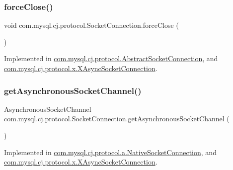\subsubsection{\texorpdfstring{force\+Close()}{forceClose()}}
{\footnotesize\ttfamily void com.\+mysql.\+cj.\+protocol.\+Socket\+Connection.\+force\+Close (\begin{DoxyParamCaption}{ }\end{DoxyParamCaption})}



Implemented in \mbox{\hyperlink{classcom_1_1mysql_1_1cj_1_1protocol_1_1_abstract_socket_connection_a1c207a3f49d387dec92de48fc141de65}{com.\+mysql.\+cj.\+protocol.\+Abstract\+Socket\+Connection}}, and \mbox{\hyperlink{classcom_1_1mysql_1_1cj_1_1protocol_1_1x_1_1_x_async_socket_connection_ac282682b46d2807beef590caebaa5b71}{com.\+mysql.\+cj.\+protocol.\+x.\+X\+Async\+Socket\+Connection}}.

\mbox{\label{interfacecom_1_1mysql_1_1cj_1_1protocol_1_1_socket_connection_acab5267ec9b4013b52015a1d9097066b}} 
\subsubsection{\texorpdfstring{get\+Asynchronous\+Socket\+Channel()}{getAsynchronousSocketChannel()}}
{\footnotesize\ttfamily Asynchronous\+Socket\+Channel com.\+mysql.\+cj.\+protocol.\+Socket\+Connection.\+get\+Asynchronous\+Socket\+Channel (\begin{DoxyParamCaption}{ }\end{DoxyParamCaption})}



Implemented in \mbox{\hyperlink{classcom_1_1mysql_1_1cj_1_1protocol_1_1a_1_1_native_socket_connection_a2c48d7701f27174e67e79cee1deb78d1}{com.\+mysql.\+cj.\+protocol.\+a.\+Native\+Socket\+Connection}}, and \mbox{\hyperlink{classcom_1_1mysql_1_1cj_1_1protocol_1_1x_1_1_x_async_socket_connection_a1c70e8bf34ff9c3f1b2b0007260f10e7}{com.\+mysql.\+cj.\+protocol.\+x.\+X\+Async\+Socket\+Connection}}.

